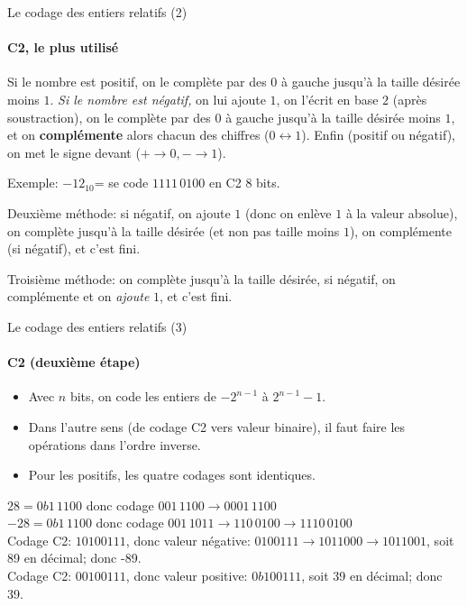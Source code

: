 \begin{frame}{Le codage des entiers relatifs (2)}
  \framesubtitle{C2, le plus utilisé}
  \begin{definition}
    Si le nombre est positif, on le complète par des $0$ à gauche jusqu'à
    la taille désirée moins $1$. \emph{Si le nombre est négatif,} on lui
    ajoute $1$, on l'écrit en base $2$ (après soustraction), on le
    complète par des $0$ à gauche jusqu'à la taille désirée moins
    $1$, et on \textbf{complémente} alors chacun des chiffres
    ($0\leftrightarrow1$). Enfin (positif ou négatif), on met le signe
    devant ($+\rightarrow0,-\rightarrow1$).

    Exemple: $-12_{10}$= se code $1111\,0100$ en C2 8 bits.
  \end{definition}

  Deuxième méthode: si négatif, on ajoute $1$ (donc on enlève $1$ à la
  valeur absolue), on complète jusqu'à la taille désirée (et non pas
  taille moins $1$), on complémente (si négatif), et c'est fini.

  Troisième méthode: on complète jusqu'à la taille désirée, si négatif,
  on complémente et on \emph{ajoute} $1$, et c'est fini.
\end{frame}
\begin{frame}{Le codage des entiers relatifs (3)}
  \framesubtitle{C2 (deuxième étape)}
  \begin{itemize}
  \item Avec $n$ bits, on code les entiers de $-2^{n-1}$ à $2^{n-1}-1$.
  \item Dans l'autre sens (de codage C2 vers valeur binaire), il faut faire les
    opérations dans l'ordre inverse.
  \item Pour les positifs, les quatre codages sont identiques.
  \end{itemize}
  \begin{example}
    $28=0b1\,1100$ donc codage $001\,1100\rightarrow0001\,1100$\\
    $-28=0b1\,1100$ donc codage
    $001\,1011\rightarrow110\,0100\rightarrow1110\,0100$\\
    Codage C2: $10100111$, donc valeur négative:
    $0100111\rightarrow1011000\rightarrow1011001$, soit 89 en décimal;
    donc -89.\\
    Codage C2: $00100111$, donc valeur positive: $0b100111$, soit 39 en
    décimal; donc 39.
  \end{example}
\end{frame}

